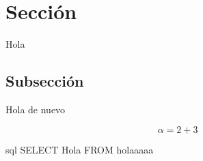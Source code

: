 
\section{Sección}

Hola

\subsection{Subsección}

Hola de nuevo

\begin{equation}
    \alpha = 2 + 3
\end{equation}

\begin{mintedcode}{sql}
    SELECT Hola
    FROM holaaaaa
\end{mintedcode}